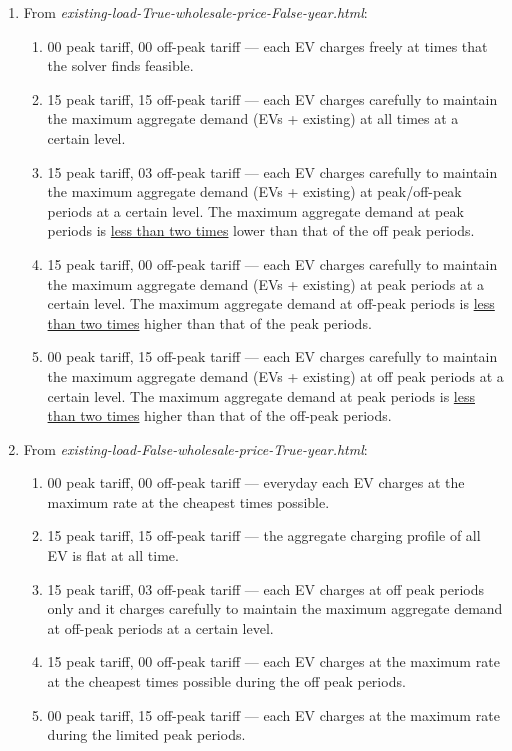 \documentclass[a4paper, oneandhalfspace]{llncs}
\begin{document}
\begin{enumerate}
	\item From \textit{existing-load-True-wholesale-price-False-year.html}:
	
	\begin{enumerate}
		\item 00 peak tariff, 00 off-peak tariff --- each EV charges freely at times that the solver finds feasible. 
		\item 15 peak tariff, 15 off-peak tariff --- each EV charges carefully to maintain the maximum aggregate demand (EVs + existing) at all times at a certain level.
		\item 15 peak tariff, 03 off-peak tariff --- each EV charges carefully to maintain the maximum aggregate demand (EVs + existing) at peak/off-peak periods at a certain level. The maximum aggregate demand at peak periods is \underline{less than two times} lower than that of the off peak periods.
		\item 15 peak tariff, 00 off-peak tariff --- each EV charges carefully to maintain the maximum aggregate demand (EVs + existing) at peak periods at a certain level. The maximum aggregate demand at off-peak periods is \underline{less than two times} higher than that of the peak periods.
		\item 00 peak tariff, 15 off-peak tariff --- each EV charges carefully to maintain the maximum aggregate demand (EVs + existing) at off peak periods at a certain level. The maximum aggregate demand at peak periods is \underline{less than two times} higher than that of the off-peak periods.
	\end{enumerate}
	
	\item From \textit{existing-load-False-wholesale-price-True-year.html}:
	
	\begin{enumerate}
		\item 00 peak tariff, 00 off-peak tariff --- everyday each EV charges at the maximum rate at the cheapest times possible.
		\item 15 peak tariff, 15 off-peak tariff --- the aggregate charging profile of all EV is flat at all time.
		\item 15 peak tariff, 03 off-peak tariff --- each EV charges at off peak periods only and it charges carefully to maintain the maximum aggregate demand at off-peak periods at a certain level.
		\item 15 peak tariff, 00 off-peak tariff --- each EV charges at the maximum rate at the cheapest times possible during the off peak periods.
		\item 00 peak tariff, 15 off-peak tariff --- each EV charges at the maximum rate during the limited peak periods. 
	\end{enumerate}
	
\end{enumerate}
\end{document}
